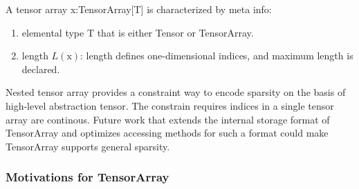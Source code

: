 A tensor array x:TensorArray[T] is characterized by meta info:
\begin{enumerate}
  \item elemental type T that is either Tensor or TensorArray.
  \item length $L(\text{x})$: length defines one-dimensional indices, and maximum length is declared.
\end{enumerate}

Nested tensor array provides a constraint way to encode sparsity on the basis of high-level abstraction tensor. The constrain requires indices in a single tensor array are continous. Future work that extends the internal storage format of TensorArray and optimizes accessing methods for such a format could make TensorArray supports general sparsity.

\subsubsection{Motivations for TensorArray}

